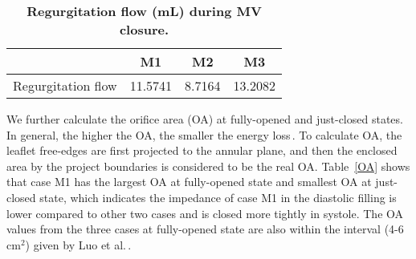 \documentclass[fleqn,10pt]{wlscirep}
\begin{document}
\begin{table}[!h]
	\centering
	\caption{\bf Regurgitation flow (mL) during MV closure.}
	\begin{tabular}{cccc}
		\hline
		& M1 & M2 & M3 \\\hline
		Regurgitation flow & 11.5741 & 8.7164 & 13.2082 \\
		\hline
	\end{tabular}
	\label{EOA}
\end{table}





We further calculate the orifice area (OA) at fully-opened and just-closed states. 
In general, the higher the OA, the smaller the energy loss\,\cite{Garcia-2006}. To calculate OA, the leaflet free-edges are first projected to the annular plane, and then the enclosed area by the project boundaries is considered to be the real OA. %
Table~\ref{OA} shows that case M1 has the largest OA at fully-opened state and smallest OA at just-closed state, which indicates the impedance of case M1 in the diastolic filling is lower compared to other two cases and is closed more tightly in systole.  The OA values from the three cases at fully-opened state are also within the interval (4-6\,cm$^2$) given by Luo et al.\,\cite{LuoGriffith-2012}. 
\end{document}
